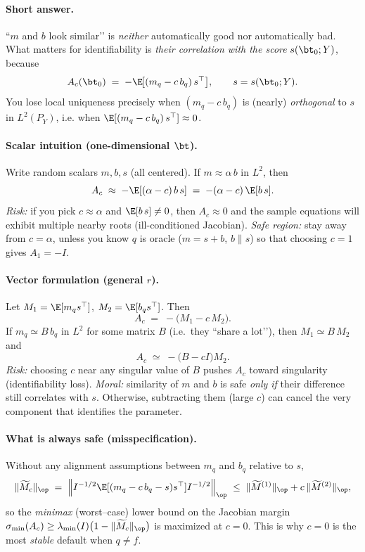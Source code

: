 \paragraph{Short answer.}
“$m$ and $b$ look similar’’ is \emph{neither} automatically good nor automatically bad.  
What matters for identifiability is \emph{their correlation with the score} $s(\bt_0;Y)$, because
\[
A_c(\bt_0)\;=\;-\E\!\big[(m_q-c\,b_q)\,s^\top\big],\qquad s=s(\bt_0;Y).
\]
You lose local uniqueness precisely when $(m_q-c\,b_q)$ is (nearly) \emph{orthogonal} to $s$ in $L^2(P_Y)$, i.e. when $\E[(m_q-c\,b_q)\,s^\top]\approx 0$.

\paragraph{Scalar intuition (one-dimensional $\bt$).}
Write random scalars $m,b,s$ (all centered). If $m\approx \alpha\,b$ in $L^2$, then
\[
A_c\;\approx\;-\E[(\alpha-c)\,b\,s]\;=\;-(\alpha-c)\,\E[b\,s].
\]
\emph{Risk:} if you pick $c\approx \alpha$ and $\E[b\,s]\neq 0$, then $A_c\approx 0$ and the sample equations will exhibit multiple nearby roots (ill-conditioned Jacobian).  
\emph{Safe region:} stay away from $c=\alpha$, unless you know $q$ is oracle ($m=s+b$, $b\parallel s$) so that choosing $c=1$ gives $A_1=-I$.

\paragraph{Vector formulation (general $r$).}
Let $M_1=\E[m_q s^\top]$, $M_2=\E[b_q s^\top]$. Then
\[
A_c\;=\;-\big(M_1-c\,M_2\big).
\]
If $m_q\simeq B\,b_q$ in $L^2$ for some matrix $B$ (i.e.\ they “share a lot’’), then $M_1\simeq B\,M_2$ and
\[
A_c\;\simeq\;-\big(B-cI\big)M_2.
\]
\emph{Risk:} choosing $c$ near any singular value of $B$ pushes $A_c$ toward singularity (identifiability loss).  
\emph{Moral:} similarity of $m$ and $b$ is safe \emph{only if} their difference still correlates with $s$. Otherwise, subtracting them (large $c$) can cancel the very component that identifies the parameter.

\paragraph{What is always safe (misspecification).}
Without any alignment assumptions between $m_q$ and $b_q$ relative to $s$,
\[
\|\widetilde M_c\|_{\op}\;=\;\Big\|I^{-1/2}\E[(m_q-c\,b_q-s)s^\top]I^{-1/2}\Big\|_{\op}
\;\le\;\|\widetilde M^{(1)}\|_{\op}+c\,\|\widetilde M^{(2)}\|_{\op},
\]
so the \emph{minimax} (worst–case) lower bound on the Jacobian margin
$\sigma_{\min}(A_c)\ge \lambda_{\min}(I)\big(1-\|\widetilde M_c\|_{\op}\big)$
is maximized at $c=0$. This is why $c=0$ is the most \emph{stable} default when $q\neq f$.

